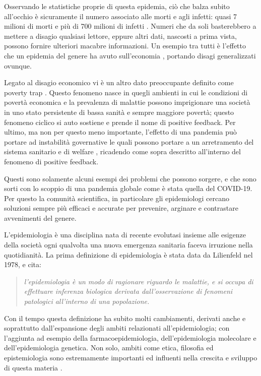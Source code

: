 Osservando le statistiche proprie di questa epidemia, 
ciò che balza subito all’occhio è sicuramente il numero 
associato alle morti e agli infetti: quasi 7 milioni di 
morti e più di 700 milioni di infetti \cite{world_health_organization}. 
Numeri che da soli basterebbero a mettere a disagio 
qualsiasi lettore, eppure altri dati, nascosti a prima 
vista, possono fornire ulteriori macabre informazioni. 
Un esempio tra tutti è l’effetto che un epidemia del 
genere ha avuto sull’economia \cite{world_bank_group_2023}, 
portando disagi generalizzati ovunque. 

Legato al disagio economico vi è un altro dato preoccupante 
definito come poverty trap \cite{Bonds2009-sg}. 
Questo fenomeno nasce in quegli ambienti in cui le 
condizioni di povertà economica e la prevalenza di malattie 
possono imprigionare una società in uno stato persistente 
di bassa sanità e sempre maggiore povertà; 
questo fenomeno ciclico si auto sostiene e prende il nome 
di positive feedback. 
Per ultimo, ma non per questo meno importante, l’effetto di 
una pandemia può portare ad instabilità governative le 
quali possono portare a un arretramento del sistema 
sanitario e di welfare \cite{https://doi.org/10.1002/epa2.1152}, 
ricadendo come sopra descritto all’interno del fenomeno di positive feedback.

Questi sono solamente alcuni esempi dei problemi che 
possono sorgere, e che sono sorti con lo scoppio di una 
pandemia globale come è stata quella del COVID-19. 
Per questo la comunità scientifica, in particolare gli 
epidemiologi cercano soluzioni sempre più efficaci e 
accurate per prevenire, arginare e contrastare avvenimenti 
del genere.

L’epidemiologia è una disciplina nata di recente 
evolutasi insieme alle esigenze della società ogni 
qualvolta una nuova emergenza sanitaria faceva irruzione 
nella quotidianità. La prima definizione di epidemiologia 
è stata data da Lilienfeld \cite{10.1371/journal.pone.0208442} 
nel 1978, e cita: 

\begin{quotation}
    \emph{l’epidemiologia è un modo di ragionare riguardo le 
    malattie, e si occupa di effettuare inferenza biologica 
    derivata dall’osservazione di fenomeni patologici 
    all’interno di una popolazione.}
\end{quotation}

Con il tempo questa definizione ha subito molti cambiamenti, 
derivati anche e soprattutto dall’espansione degli ambiti 
relazionati all’epidemiologia; con l’aggiunta ad esempio 
della farmacoepidemiologia, dell’epidemiologia molecolare 
e dell’epidemiologia genetica. Non solo, ambiti come etica, 
filosofia ed epistemiologia sono estremamente importanti 
ed influenti nella crescita e sviluppo di questa materia \cite{10.1371/journal.pone.0208442}. 

